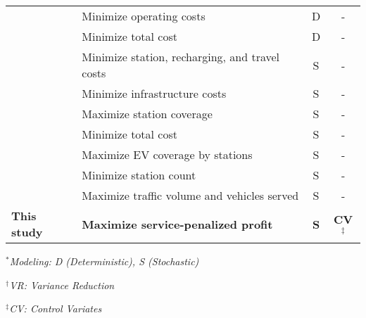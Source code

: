 \begin{table*}
{\begin{threeparttable}[t]
\begin{tabular}{@{}llcc@{}}
\textcite{zhang2022bi} & Minimize operating costs & D & - \\
\textcite{amilia2022designing} & Minimize total cost & D & - \\
\textcite{hosseini2015refueling} & Minimize station, recharging, and travel costs & S & - \\
\textcite{yildiz2019urban} & Minimize infrastructure costs & S & - \\
\textcite{alhazmi2017optimal} & Maximize station coverage & S & - \\
\textcite{li2016multi} & Minimize total cost & S & - \\
\textcite{ren2019location} & Maximize EV coverage by stations & S & - \\
\textcite{vazifeh2019optimizing} & Minimize station count & S & - \\
\textcite{speth2022public} & Maximize traffic volume and vehicles served & S & - \\
\textbf{This study} & \textbf{Maximize service-penalized profit} & \textbf{S} & \textbf{CV}$^\ddagger$ \\ 
\bottomrule
\end{tabular}
\begin{tablenotes}
    \item[~]$^*$\textit{Modeling: D (Deterministic), S (Stochastic)}
    \item[~]$^\dagger$\textit{VR: Variance Reduction}
    \item[~]$^\ddagger$\textit{CV: Control Variates}
\end{tablenotes}
\end{threeparttable}%
}
    \label{tab:review}
\end{table*}
